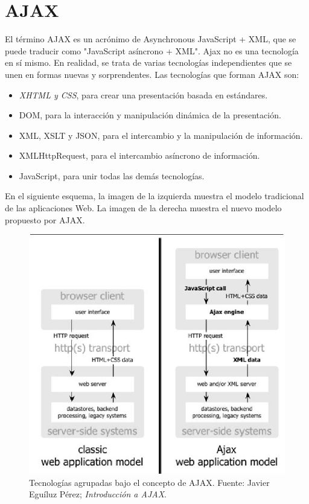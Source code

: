 \section{AJAX}
El t\'ermino AJAX es un acr\'onimo de Asynchronous JavaScript + XML, que se puede traducir como "JavaScript as\'incrono + XML". Ajax no es una tecnolog\'ia en s\'i mismo. En realidad, se trata de varias tecnolog\'ias independientes que se unen en formas nuevas y sorprendentes. \cite{ajax}
Las tecnolog\'ias que forman AJAX son:

\begin{itemize}
\item \textsl{XHTML y CSS}, para crear una presentaci\'on basada en est\'andares.
\item DOM, para la interacci\'on y manipulaci\'on din\'amica de la presentaci\'on.
\item XML, XSLT y JSON, para el intercambio y la manipulaci\'on de informaci\'on.
\item XMLHttpRequest, para el intercambio as\'incrono de informaci\'on.
\item JavaScript, para unir todas las dem\'as tecnolog\'ias.
\end{itemize}

En el siguiente esquema, la imagen de la izquierda muestra el modelo tradicional de las aplicaciones Web. La imagen de la derecha muestra el nuevo modelo propuesto por AJAX.

\begin{figure}[h]
\centering
\includegraphics[scale=.7, keepaspectratio=true]{imagenes/02_imagen.png}
\caption{Tecnolog\'ias agrupadas bajo el concepto de AJAX. Fuente: Javier Egu\'iluz P\'erez; \textit{Introducci\'on a AJAX}.}
\end{figure}

